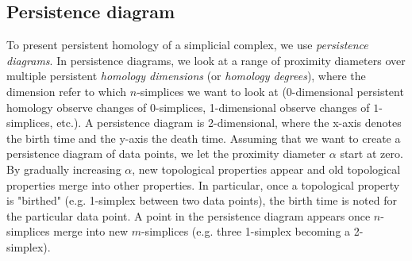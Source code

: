 \subsection{Persistence diagram}
\label{sec:persistence diagram}
To present persistent homology of a simplicial complex, we use \textit{persistence diagrams}. In persistence diagrams, we look at a range of proximity diameters over multiple persistent \textit{homology dimensions} (or \textit{homology degrees}), where the dimension refer to which $n$-simplices we want to look at (0-dimensional persistent homology observe changes of $0$-simplices, 1-dimensional observe changes of $1$-simplices, etc.). A persistence diagram is 2-dimensional, where the x-axis denotes the birth time and the y-axis the death time. Assuming that we want to create a persistence diagram of data points, we let the proximity diameter $\alpha$ start at zero. By gradually increasing $\alpha$, new topological properties appear and old topological properties merge into other properties. In particular, once a topological property is "birthed" (e.g. 1-simplex between two data points), the birth time is noted for the particular data point. A point in the persistence diagram appears once $n$-simplices merge into new $m$-simplices (e.g. three 1-simplex becoming a 2-simplex).

